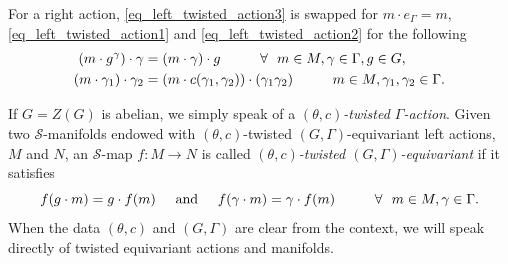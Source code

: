 For a right action, \eqref{eq_left_twisted_action3} is swapped for \(m\cdot e_\Gamma=m\),  \eqref{eq_left_twisted_action1} and \eqref{eq_left_twisted_action2} for the following
\begin{align}
    (m\cdot g^\gamma)\cdot \gamma &= (m \cdot \gamma)\cdot g \hspace{1 cm} \forall \ \ m \in M, \gamma \in \Gamma,  g \in G, \label{eq_right_twisted_action1} \\ 
    (m\cdot \gamma_1)\cdot \gamma_2 &= (m\cdot c(\gamma_1, \gamma_2))\cdot (\gamma_1 \gamma _2) \hspace{1 cm} m \in M, \gamma_1, \gamma_2 \in \Gamma.  \label{eq_right_twisted_action2}
\end{align}

If \(G=Z(G)\) is abelian, we simply speak of a \((\theta, c)\)\textit{-twisted \(\Gamma\)-action}. Given two \(\mathcal{S}\)-manifolds endowed with \((\theta,c)\)-twisted \((G, \Gamma)\)-equivariant left actions, \(M\) and \(N\), an \(\mathcal{S}\)-map \(f\colon M \to N\) is called \textit{\((\theta, c)\)-twisted \((G, \Gamma)\)-equivariant} if it satisfies 
\begin{equation} \label{eq_def_twisted_equiv_map}
f(g \cdot m) = g\cdot f(m) \hspace{0.5 cm} \text{and} \hspace{0.5 cm} f(\gamma \cdot m)=\gamma \cdot f(m) \hspace{1 cm} \forall \ \ m \in M, \gamma \in \Gamma.
\end{equation}
When the data \((\theta, c)\) and \((G, \Gamma)\) are clear from the context, we will speak directly of twisted equivariant actions and manifolds. 

